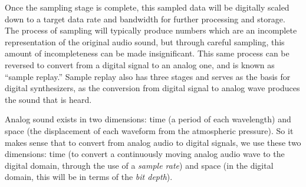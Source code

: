 Once the sampling stage is complete, this sampled data will be digitally scaled down to a target data rate and bandwidth for further processing and storage. The process of sampling will typically produce numbers which are an incomplete representation of the original audio sound, but through careful sampling, this amount of incompleteness can be made insignificant. This same process can be reversed to convert from a digital signal to an analog one, and is known as ``sample replay.'' Sample replay also has three stages and serves as the basis for digital synthesizers, as the conversion from digital signal to analog wave produces the sound that is heard.


Analog sound exists in two dimensions: time (a period of each wavelength) and space (the displacement of each waveform from the atmospheric pressure). So it makes sense that to convert from analog audio to digital signals, we use these two dimensions: time (to convert a continuously moving analog audio wave to the digital domain, through the use of a \textit{sample rate}) and space (in the digital domain, this will be in terms of the \textit{bit depth}). 

